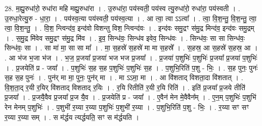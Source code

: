 \documentclass[17pt]{extarticle}
\begin{document}
28. म॒ह्यु॒रुधा॑रो॒ रुधा॑रा महि मह्यु॒रुधा॑रा । . उ॒रुधा॑रा॒ पय॑स्वती॒ पय॑स्व त्यु॒रुधा॑रो॒ रुधा॑रा॒ पय॑स्वती । . उ॒रुधा॒रेत्यु॒रु - धा॒रा॒ । . पय॑स्व॒त्या पय॑स्वती॒ पय॑स्व॒त्या । . आ त्वा॒ त्वा ऽऽत्वा᳚ । . त्वा॒ वि॒श॒न्तु॒ वि॒श॒न्तु॒ त्वा॒ त्वा॒ वि॒श॒न्तु॒ । . वि॒श॒ न्त्विन्द॑व॒ इन्द॑वो विशन्तु विश॒ न्त्विन्द॑वः । . इन्द॑वः समु॒द्रꣳ स॑मु॒द्र मिन्द॑व॒ इन्द॑वः समु॒द्रम् । . स॒मु॒द्र मि॑वेव समु॒द्रꣳ स॑मु॒द्र मि॑व । . इ॒व॒ सिन्ध॑वः॒ सिन्ध॑व इवेव॒ सिन्ध॑वः । . सिन्ध॑वः॒ सा सा सिन्ध॑वः॒ सिन्ध॑वः॒ सा । . सा मा॑ मा॒ सा सा मा᳚ । . मा॒ स॒हस्रे॑ स॒हस्रे॑ मा मा स॒हस्रे᳚ । . स॒हस्र॒ आ स॒हस्रे॑ स॒हस्र॒ आ । . आ भ॑ज भ॒जा भ॑ज । . भ॒ज॒ प्र॒जया᳚ प्र॒जया॑ भज भज प्र॒जया᳚ । . प्र॒जया॑ प॒शुभिः॑ प॒शुभिः॑ प्र॒जया᳚ प्र॒जया॑ प॒शुभिः॑ । . प्र॒जयेति॑ प्र - जया᳚ । . प॒शुभिः॑ स॒ह स॒ह प॒शुभिः॑ प॒शुभिः॑ स॒ह । . प॒शुभि॒रिति॑ प॒शु - भिः॒ । . स॒ह पुनः॒ पुनः॑ स॒ह स॒ह पुनः॑ । . पुन॑र् मा मा॒ पुनः॒ पुन॑र् मा । . मा ऽऽमा॒ मा । . आ वि॑शताद् विशता॒दा वि॑शतात् । . वि॒श॒ता॒द् र॒यी र॒यिर् वि॑शताद् विशताद् र॒यिः । . र॒यि रितीति॑ र॒यी र॒यि रिति॑ । . इति॑ प्र॒जया᳚ प्र॒जये तीति॑ प्र॒जया᳚ । . प्र॒जयै॒वैव प्र॒जया᳚ प्र॒ज यै॒व । . प्र॒जयेति॑ प्र - जया᳚ । . ए॒वैन॑ मेन मे॒वैवैन᳚म् । . ए॒न॒म् प॒शुभिः॑ प॒शुभि॑ रेन मेनम् प॒शुभिः॑ । . प॒शुभी॑ र॒य्या र॒य्या प॒शुभिः॑ प॒शुभी॑ र॒य्या । . प॒शुभि॒रिति॑ प॒शु - भिः॒ । . र॒य्या सꣳ सꣳ र॒य्या र॒य्या सम् । . स म॑र्द्धय त्यर्द्धयति॒ सꣳ स म॑र्द्धयति । \newline
\end{document}
